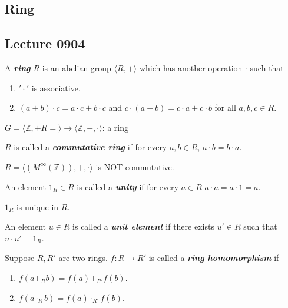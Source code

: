 \documentclass{article}
\begin{document}
\begin{multicols}{2}
\tableofcontents

\section{Ring}
\subsection{Lecture 0904}

\begin{mydefinition}
[Ring]
A \textbf{\emph{ring}} $R$ is an abelian group $\langle R, + \rangle $ which has another operation $\cdot$ such that
\begin{enumerate}[label={(\alph*)}]
\item $'\cdot'$ is associative.
\item $(a+b)\cdot c=a\cdot c + b\cdot c$ and $c\cdot(a+b)=c\cdot a+c\cdot b$ for all $a,b,c\in R$.
\end{enumerate}
\end{mydefinition}

\begin{example}
$G= \langle \mathbb{Z},+ R=\rangle\to \langle \mathbb{Z},+,\cdot  \rangle$: a ring
\end{example}

\begin{mydefinition}
$R$ is called a \textbf{\emph{commutative ring}} if for every $a,b\in R$, $a\cdot b=b\cdot a$.
\end{mydefinition}

\begin{example}
$R=\langle (M^\infty (\mathbb{Z})),+,\cdot  \rangle $ is NOT commutative.
\end{example}

\begin{mydefinition}
An element $1_R\in R$ is called a \textbf{\emph{unity}} if for every $a\in R$ $a\cdot a=a\cdot 1=a$.
\end{mydefinition}

\begin{myproposition}
$1_R$ is unique in $R$.
\end{myproposition}

\begin{mydefinition}
An element $u\in R$ is called a \textbf{\emph{unit element}} if there exists $u'\in R$ such that $u\cdot u'=1_R$.
\end{mydefinition}

\begin{mydefinition}
Suppose $R,R'$ are two rings. $f:R\to R'$ is called a \textbf{\emph{ring homomorphism}} if
\begin{enumerate}[label={(\alph*)}]
\item $f(a+_Rb)=f(a)+_{R'}f(b)$.
\item $f(a\cdot_R b)=f(a)\cdot_{R'} f(b)$.
\end{enumerate}
\end{mydefinition}


\end{multicols}
\end{document}
